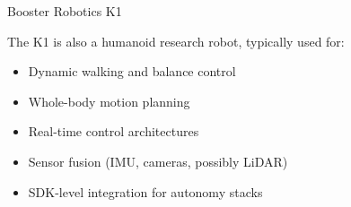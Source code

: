 \documentclass[a4paper]{article}
\title{}
\date{}
\begin{document}
    \maketitle
    Booster Robotics K1


    The K1 is also a humanoid research robot, typically used for:
    
    
    \begin{itemize}
    
        \item
        Dynamic walking and balance control
        
        
        
        
        \item
        Whole-body motion planning
        \item
        Real-time control architectures
        \item
        Sensor fusion (IMU, cameras, possibly LiDAR)
        \item
        SDK-level integration for autonomy stacks
    
    
    \end{itemize}
\end{document}
